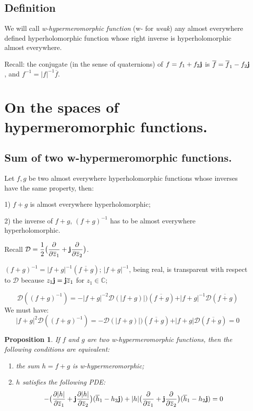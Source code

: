\documentclass[12pt]{amsart}
\newtheorem{prop}[thm]{Proposition}
\theoremstyle{definition}
\begin{document}
\subsection{Definition} We will call {\it w-hypermeromorphic function} (w- for {\it weak}) any almost everywhere defined hyperholomorphic function whose right inverse is hyperholomorphic almost everywhere. \smallskip 

Recall: the conjugate (in the sense of quaternions) of $f=f_1+f_2{\bf j}$ is $\overline f=\overline f_1-f_2{\bf j}$, and $f^{-1}=\vert f\vert^{-1}\overline f$. 

\section{On the spaces of hypermeromorphic functions.} 

\subsection{Sum of two w-hypermeromorphic functions.}
Let $f, g$ be two almost everywhere hyperholomorphic functions whose inverses have the same property, then: 

1) $f+g$ is almost everywhere hyperholomorphic; 

2) the inverse of $f+g$, $(f+g)^{-1}$ has to be almost everywhere hyperholomorphic. \smallskip 

Recall $\displaystyle {\mathcal D}=\frac{1}{2}\big(\frac{\partial}{\partial\overline z_1}
+{\bf j}\frac{\partial}{\partial\overline z_2}\big)$.

$(f+g)^{-1}=\vert f+g\vert^{-1}(\overline {f+g})$; $\vert f+g\vert^{-1}$, being real, is transparent with respect to ${\mathcal D}$ because $z_1{\bf j}={\bf j}\overline z_1$ for $z_1\in{\mathbb{C}}$;

$$
{\mathcal D}((f+g)^{-1})=-{\vert f+g\vert}^{-2}{\mathcal D}(\vert f+g)\vert)(\overline {f+g})+\vert f+g\vert ^ {-1}{\mathcal D}(\overline {f+g})
$$
We must have:
$$
{\vert f+g\vert}^2{\mathcal D}((f+g)^{-1})=-{\mathcal D}(\vert f+g)\vert)(\overline {f+g})+\vert f+g\vert {\mathcal D}(\overline {f+g})=0
$$

\begin{prop}If $f$ and $g$ are two w-hypermeromorphic functions, then the following conditions are equivalent:
\begin{enumerate}
\item[$(i)$] the sum $h=f+g$ is w-hypermeromorphic; 
\item[$(ii)$] $h$ satisfies the following PDE:
$$
-\big( \frac{\partial \vert h\vert}{\partial\overline z_1}+{\bf j}\frac{\partial\vert h\vert}{\partial\overline z_2}\big) (\overline h_1-h_2{\bf j})+\vert h\vert  {\big(\frac{\partial}{\partial\overline z_1}
+{\bf j}\frac{\partial}{\partial\overline z_2}\big)}(\overline h_1-h_2{\bf j})=0
$$
\end{enumerate}
\end{prop}
\end{document}
